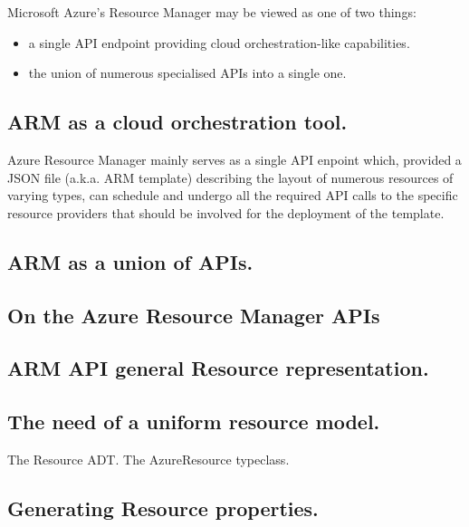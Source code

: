 \documentclass[11pt]{article}
\begin{document}
Microsoft Azure's Resource Manager may be viewed as one of two things:

\begin{itemize}
    \item{a single API endpoint providing cloud orchestration-like capabilities.}
    \item{the union of numerous specialised APIs into a single one.}
\end{itemize}


\subsection{ARM as a cloud orchestration tool.}
Azure Resource Manager mainly serves as a single API enpoint which, provided a
JSON file (a.k.a. ARM template) describing the layout of numerous resources of
varying types, can schedule and undergo all the required API calls to the specific
resource providers that should be involved for the deployment of the template.


\subsection{ARM as a union of APIs.}


\subsection{On the Azure Resource Manager APIs}


\subsection{ARM API general Resource representation.}


\subsection{The need of a uniform resource model.}

The Resource ADT\@.
The AzureResource typeclass.


\subsection{Generating Resource properties.}
\end{document}
